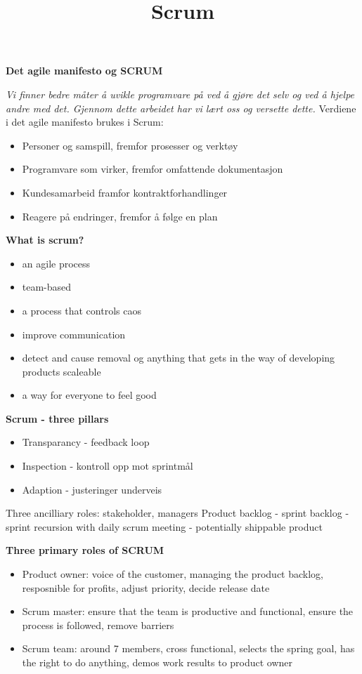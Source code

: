 \documentclass{article}
\title{Scrum}
\begin{document}
\begin{flushleft}
    
    \textbf{\large Det agile manifesto og SCRUM}\par 

    \emph{Vi finner bedre måter å uvikle programvare på ved å gjøre det selv og ved å hjelpe andre med det. Gjennom dette arbeidet har vi lært oss og versette dette.}
    Verdiene i det agile manifesto brukes i Scrum:
    \begin{itemize}
        \item Personer og samspill, fremfor prosesser og verktøy
        \item Programvare som virker, fremfor omfattende dokumentasjon
        \item Kundesamarbeid framfor kontraktforhandlinger
        \item Reagere på endringer, fremfor å følge en plan
    \end{itemize}

    \dotfill

    \textbf{What is scrum?}\par 
    \begin{itemize}
        \item an agile process
        \item team-based
        \item a process that controls caos
        \item improve communication
        \item detect and cause removal og anything that gets in the way of developing products scaleable
        \item a way for everyone to feel good
    \end{itemize}

    \textbf{Scrum - three pillars}\par 
    \begin{itemize}
        \item Transparancy - feedback loop
        \item Inspection - kontroll opp mot sprintmål
        \item Adaption - justeringer underveis
    \end{itemize}
    Three ancilliary roles: stakeholder, managers
    Product backlog - sprint backlog - sprint recursion with daily scrum meeting - potentially shippable product 
    
    \bigskip

    \textbf{Three primary roles of SCRUM}\par
    \begin{itemize}
        \item Product owner: voice of the customer, managing the product backlog, resposnible for profits, adjust priority, decide release date
        \item Scrum master: ensure that the team is productive and functional, ensure the process is followed, remove barriers
        \item Scrum team: around 7 members, cross functional, selects the spring goal, has the right to do anything, demos work results to product owner
    \end{itemize}


\end{flushleft}
\end{document}
